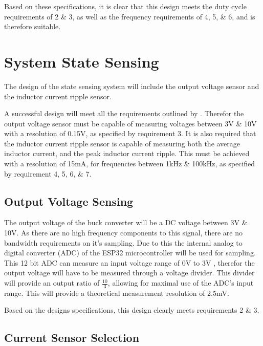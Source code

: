 Based on these specifications, it is clear that this design meets the duty cycle requirements of 2 \& 3, as well as the frequency requirements of 4, 5, \& 6, and is therefore suitable.
 

%
%

\section{System State Sensing}\label{S:sensing_design}

The design of the state sensing system will include the output voltage sensor and the inductor current ripple sensor.

A successful design will meet all the requirements outlined by . Therefor the output voltage sensor must be capable of measuring voltages between 3V \& 10V with a resolution of 0.15V, as specified by requirement 3. It is also required that the inductor current ripple sensor is capable of measuring both the average inductor current, and the peak inductor current ripple. This must be achieved with a resolution of 15mA, for frequencies between 1kHz \& 100kHz, as specified by requirement 4, 5, 6, \& 7.


\subsection{Output Voltage Sensing}

The output voltage of the buck converter will be a DC voltage between 3V \& 10V. As there are no high frequency components to this signal, there are no bandwidth requirements on it's sampling. Due to this the internal analog to digital converter (ADC) of the ESP32 microcontroller will be used for sampling. This 12 bit ADC can measure an input voltage range of 0V to 3V \cite{ESP32Manual}, therefor the output voltage will have to be measured through a voltage divider. This divider will provide an output ratio of $\frac{10}{3}$, allowing for maximal use of the ADC's input range. This will provide a theoretical measurement resolution of 2.5mV. 

Based on the designs specifications, this design clearly meets requirements 2 \& 3.


\subsection{Current Sensor Selection}\label{S:current_sense_selection}

